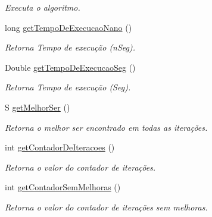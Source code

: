 \begin{DoxyCompactItemize}
\begin{DoxyCompactList}\small\item\em Executa o algoritmo. \end{DoxyCompactList}\item 
long \hyperlink{classic_1_1populacional_1_1algoritmo_1_1_algoritmo_evolucionario_3_01_gextends_01_number_01_6_co1efdb05fe19a950b8d1e9e15f7d06254_af9da640a882ddb1eb17ad360c109b530}{get\-Tempo\-De\-Execucao\-Nano} ()
\begin{DoxyCompactList}\small\item\em Retorna Tempo de execução (n\-Seg). \end{DoxyCompactList}\item 
Double \hyperlink{classic_1_1populacional_1_1algoritmo_1_1_algoritmo_evolucionario_3_01_gextends_01_number_01_6_co1efdb05fe19a950b8d1e9e15f7d06254_a9ccb62ffa2361974547cc763de474fc2}{get\-Tempo\-De\-Execucao\-Seg} ()
\begin{DoxyCompactList}\small\item\em Retorna Tempo de execução (Seg). \end{DoxyCompactList}\item 
S \hyperlink{classic_1_1populacional_1_1algoritmo_1_1_algoritmo_evolucionario_3_01_gextends_01_number_01_6_co1efdb05fe19a950b8d1e9e15f7d06254_ae50ff320a0f435c5e2d2eaaf58129680}{get\-Melhor\-Ser} ()
\begin{DoxyCompactList}\small\item\em Retorna o melhor ser encontrado em todas as iterações. \end{DoxyCompactList}\item 
int \hyperlink{classic_1_1populacional_1_1algoritmo_1_1_algoritmo_evolucionario_3_01_gextends_01_number_01_6_co1efdb05fe19a950b8d1e9e15f7d06254_adec275a30d0db288c2408b58370a8ae3}{get\-Contador\-De\-Iteracoes} ()
\begin{DoxyCompactList}\small\item\em Retorna o valor do contador de iterações. \end{DoxyCompactList}\item 
int \hyperlink{classic_1_1populacional_1_1algoritmo_1_1_algoritmo_evolucionario_3_01_gextends_01_number_01_6_co1efdb05fe19a950b8d1e9e15f7d06254_a60040842d3e086afaac59479914f2d4c}{get\-Contador\-Sem\-Melhoras} ()
\begin{DoxyCompactList}\small\item\em Retorna o valor do contador de iterações sem melhoras. \end{DoxyCompactList}\item 

\end{DoxyCompactItemize}
